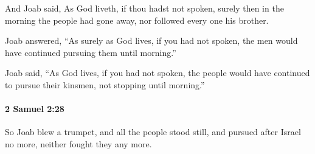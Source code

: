 			\begin{versebox}
					\item[BHS] 
					\item[ASV] And Joab said, As God liveth, if thou hadst not spoken, surely then in the morning the people had gone away, nor followed every one his brother.
					\item[NIV] Joab answered, “As surely as God lives, if you had not spoken, the men would have continued pursuing them until morning.”
					\item[NRSV] Joab said, “As God lives, if you had not spoken, the people would have continued to pursue their kinsmen, not stopping until morning.”
			\end{versebox}

		\paragraph{2 Samuel 2:28} %
			\label{2SAMUEL-2-28}

			So Joab blew a trumpet, and all the people stood still, and pursued after Israel no more, neither fought they any more.

